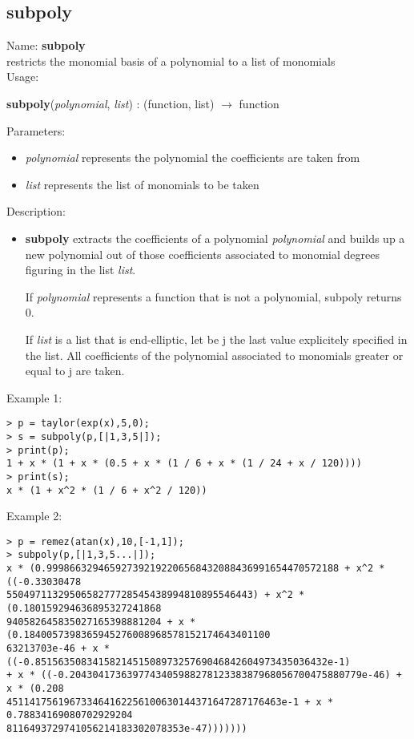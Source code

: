 \subsection{subpoly}
\label{labsubpoly}
\noindent Name: \textbf{subpoly}\\
restricts the monomial basis of a polynomial to a list of monomials\\

\noindent Usage: 
\begin{center}
\textbf{subpoly}(\emph{polynomial}, \emph{list}) : (\textsf{function}, \textsf{list}) $\rightarrow$ \textsf{function}\\
\end{center}
Parameters: 
\begin{itemize}
\item \emph{polynomial} represents the polynomial the coefficients are taken from
\item \emph{list} represents the list of monomials to be taken
\end{itemize}
\noindent Description: \begin{itemize}

\item \textbf{subpoly} extracts the coefficients of a polynomial \emph{polynomial} and builds up a
   new polynomial out of those coefficients associated to monomial degrees figuring in
   the list \emph{list}. 
    
   If \emph{polynomial} represents a function that is not a polynomial, subpoly returns 0.
    
   If \emph{list} is a list that is end-elliptic, let be j the last value explicitely specified
   in the list. All coefficients of the polynomial associated to monomials greater or
   equal to j are taken.
\end{itemize}
\noindent Example 1: 
\begin{center}\begin{minipage}{15cm}\begin{Verbatim}[frame=single]
> p = taylor(exp(x),5,0);
> s = subpoly(p,[|1,3,5|]);
> print(p);
1 + x * (1 + x * (0.5 + x * (1 / 6 + x * (1 / 24 + x / 120))))
> print(s);
x * (1 + x^2 * (1 / 6 + x^2 / 120))
\end{Verbatim}
\end{minipage}\end{center}
\noindent Example 2: 
\begin{center}\begin{minipage}{15cm}\begin{Verbatim}[frame=single]
> p = remez(atan(x),10,[-1,1]);
> subpoly(p,[|1,3,5...|]);
x * (0.999866329465927392192206568432088436991654470572188 + x^2 * ((-0.33030478
5504971132950658277728545438994810895546443) + x^2 * (0.180159294636895327241868
940582645835027165398881204 + x * (0.1840057398365945276008968578152174643401100
63213703e-46 + x * ((-0.851563508341582145150897325769046842604973435036432e-1) 
+ x * ((-0.204304173639774340598827812338387968056700475880779e-46) + x * (0.208
451141756196733464162256100630144371647287176463e-1 + x * 0.78834169080702929204
8116493729741056214183302078353e-47)))))))
\end{Verbatim}
\end{minipage}\end{center}
